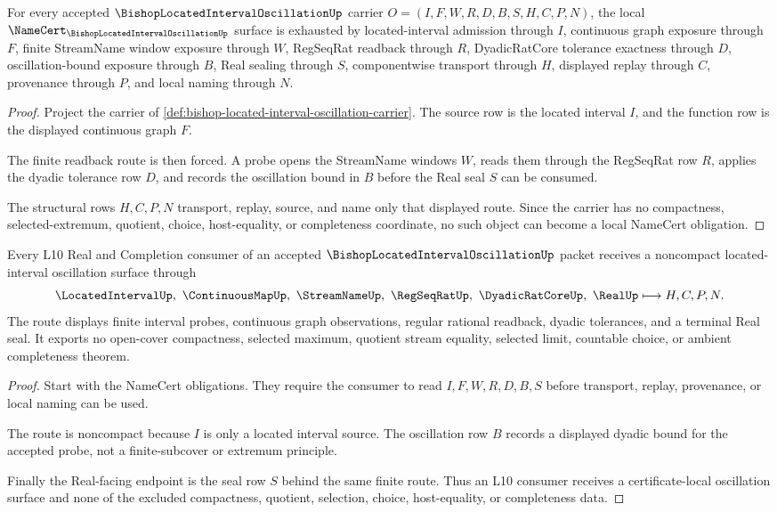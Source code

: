 \begin{theorem}
\label{thm:bishop-located-interval-oscillation-namecert-obligations}
For every accepted $\BishopLocatedIntervalOscillationUp$ carrier $O=(I,F,W,R,D,B,S,H,C,P,N)$, the local $\NameCert_{\BishopLocatedIntervalOscillationUp}$ surface is exhausted by located-interval admission through $I$, continuous graph exposure through $F$, finite StreamName window exposure through $W$, RegSeqRat readback through $R$, DyadicRatCore tolerance exactness through $D$, oscillation-bound exposure through $B$, Real sealing through $S$, componentwise transport through $H$, displayed replay through $C$, provenance through $P$, and local naming through $N$.
\end{theorem}
\begin{proof}
Project the carrier of \autoref{def:bishop-located-interval-oscillation-carrier}. The source row is the located interval $I$, and the function row is the displayed continuous graph $F$.

The finite readback route is then forced. A probe opens the StreamName windows $W$, reads them through the RegSeqRat row $R$, applies the dyadic tolerance row $D$, and records the oscillation bound in $B$ before the Real seal $S$ can be consumed.

The structural rows $H,C,P,N$ transport, replay, source, and name only that displayed route. Since the carrier has no compactness, selected-extremum, quotient, choice, host-equality, or completeness coordinate, no such object can become a local NameCert obligation.
\end{proof}

\begin{theorem}
\label{thm:bishop-located-interval-oscillation-l10-route}
Every L10 Real and Completion consumer of an accepted $\BishopLocatedIntervalOscillationUp$ packet receives a noncompact located-interval oscillation surface through
$$
\LocatedIntervalUp,\ \ContinuousMapUp,\ \StreamNameUp,\ \RegSeqRatUp,\ \DyadicRatCoreUp,\ \RealUp \longmapsto H,C,P,N .
$$
The route displays finite interval probes, continuous graph observations, regular rational readback, dyadic tolerances, and a terminal Real seal. It exports no open-cover compactness, selected maximum, quotient stream equality, selected limit, countable choice, or ambient completeness theorem.
\end{theorem}
\begin{proof}
Start with the NameCert obligations. They require the consumer to read $I,F,W,R,D,B,S$ before transport, replay, provenance, or local naming can be used.

The route is noncompact because $I$ is only a located interval source. The oscillation row $B$ records a displayed dyadic bound for the accepted probe, not a finite-subcover or extremum principle.

Finally the Real-facing endpoint is the seal row $S$ behind the same finite route. Thus an L10 consumer receives a certificate-local oscillation surface and none of the excluded compactness, quotient, selection, choice, host-equality, or completeness data.
\end{proof}

